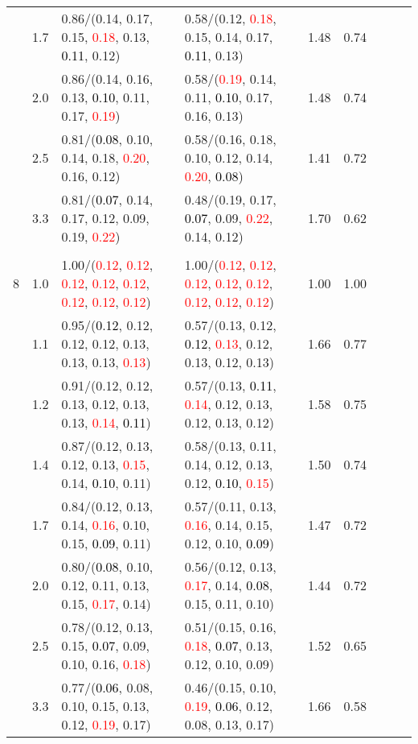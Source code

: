 \documentclass[10pt,a4paper]{report}
\begin{document}
\begin{table}[!htbp]
\begin{center}
{\begin{tabular}{ccllccccc}
			&1.7&0.86/(0.14, 0.17, 0.15, \textcolor{red}{0.18}, 0.13, \textcolor{black}{0.11}, 0.12)&0.58/(0.12, \textcolor{red}{0.18}, 0.15, 0.14, 0.17, \textcolor{black}{0.11}, 0.13)&1.48&0.74\\
			&2.0&0.86/(0.14, 0.16, 0.13, \textcolor{black}{0.10}, 0.11, 0.17, \textcolor{red}{0.19})&0.58/(\textcolor{red}{0.19}, 0.14, 0.11, \textcolor{black}{0.10}, 0.17, 0.16, 0.13)&1.48&0.74\\
			&2.5&0.81/(\textcolor{black}{0.08}, 0.10, 0.14, 0.18, \textcolor{red}{0.20}, 0.16, 0.12)&0.58/(0.16, 0.18, 0.10, 0.12, 0.14, \textcolor{red}{0.20}, \textcolor{black}{0.08})&1.41&0.72\\
			&3.3&0.81/(\textcolor{black}{0.07}, 0.14, 0.17, 0.12, 0.09, 0.19, \textcolor{red}{0.22})&0.48/(0.19, 0.17, \textcolor{black}{0.07}, 0.09, \textcolor{red}{0.22}, 0.14, 0.12)&1.70&0.62\\
			&&&&\\
			8			&1.0&1.00/(\textcolor{red}{0.12}, \textcolor{red}{0.12}, \textcolor{red}{0.12}, \textcolor{red}{0.12}, \textcolor{red}{0.12}, \textcolor{red}{0.12}, \textcolor{red}{0.12}, \textcolor{red}{0.12})&1.00/(\textcolor{red}{0.12}, \textcolor{red}{0.12}, \textcolor{red}{0.12}, \textcolor{red}{0.12}, \textcolor{red}{0.12}, \textcolor{red}{0.12}, \textcolor{red}{0.12}, \textcolor{red}{0.12})&1.00&1.00\\
			&1.1&0.95/(\textcolor{black}{0.12}, 0.12, 0.12, 0.12, 0.13, 0.13, 0.13, \textcolor{red}{0.13})&0.57/(0.13, 0.12, \textcolor{black}{0.12}, \textcolor{red}{0.13}, 0.12, 0.13, 0.12, 0.13)&1.66&0.77\\
			&1.2&0.91/(0.12, 0.12, 0.13, 0.12, 0.13, 0.13, \textcolor{red}{0.14}, \textcolor{black}{0.11})&0.57/(0.13, \textcolor{black}{0.11}, \textcolor{red}{0.14}, 0.12, 0.13, 0.12, 0.13, 0.12)&1.58&0.75\\
			&1.4&0.87/(0.12, 0.13, 0.12, 0.13, \textcolor{red}{0.15}, 0.14, \textcolor{black}{0.10}, 0.11)&0.58/(0.13, 0.11, 0.14, 0.12, 0.13, 0.12, \textcolor{black}{0.10}, \textcolor{red}{0.15})&1.50&0.74\\
			&1.7&0.84/(0.12, 0.13, 0.14, \textcolor{red}{0.16}, 0.10, 0.15, \textcolor{black}{0.09}, 0.11)&0.57/(0.11, 0.13, \textcolor{red}{0.16}, 0.14, 0.15, 0.12, 0.10, \textcolor{black}{0.09})&1.47&0.72\\
			&2.0&0.80/(\textcolor{black}{0.08}, 0.10, 0.12, 0.11, 0.13, 0.15, \textcolor{red}{0.17}, 0.14)&0.56/(0.12, 0.13, \textcolor{red}{0.17}, 0.14, \textcolor{black}{0.08}, 0.15, 0.11, 0.10)&1.44&0.72\\
			&2.5&0.78/(0.12, 0.13, 0.15, \textcolor{black}{0.07}, 0.09, 0.10, 0.16, \textcolor{red}{0.18})&0.51/(0.15, 0.16, \textcolor{red}{0.18}, \textcolor{black}{0.07}, 0.13, 0.12, 0.10, 0.09)&1.52&0.65\\
			&3.3&0.77/(\textcolor{black}{0.06}, 0.08, 0.10, 0.15, 0.13, 0.12, \textcolor{red}{0.19}, 0.17)&0.46/(0.15, 0.10, \textcolor{red}{0.19}, \textcolor{black}{0.06}, 0.12, 0.08, 0.13, 0.17)&1.66&0.58\\
			\bottomrule
		\end{tabular}}
	\end{center}
\end{table}
\end{document}
